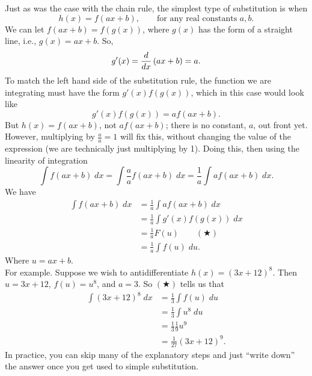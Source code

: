 \noindent Just as was the case with the chain rule, the simplest type of substitution is when
\[
h(x) = f(ax+b), \qquad \text{for any real constants $a,b.$}
\] 
We can let $f(ax+b) = f(g(x))$, where $g(x)$ has the form of a straight line, i.e., $g(x) = ax+b$. So,
\[
g'(x) = \frac{d}{dx}\left(ax+b\right) = a.
\]
To match the left hand side of the substitution rule, the function we are integrating must have the form $g'(x)f(g(x))$, which in this case would look like
\[
g'(x)f(g(x)) = af(ax+b). \tag{since $g'(x) = a$}
\]
But $h(x) = f(ax+b)$, not $af(ax+b)$; there is no constant, $a$, out front yet. However, multiplying by $\frac{a}{a} = 1$ will fix this, without changing the value of the expression (we are technically just multiplying by 1). Doing this, then using the linearity of integration
\[
\int f(ax+b) \; dx = \int\frac{a}{a} f(ax+b) \; dx = \frac{1}{a} \int af(ax+b) \; dx.
\]
We have
\begin{align*}
\int f(ax+b) \; dx & = \frac{1}{a} \int af(ax+b) \; dx \\
	& = \frac{1}{a} \int g'(x)f(g(x)) \; dx \tag{since $g(x) = ax+b$ and $g'(x) = a$} \\
	& = \frac{1}{a} F(u) \qquad (\bigstar) \tag{letting $u = g(x)$, integration by substitution} \\
	& = \frac{1}{a} \int f(u) \; du. \tag{since $F$ is an antiderivative of $f$}
\end{align*}
Where $u = ax+b$. \\

\noindent For example. Suppose we wish to antidifferentiate $h(x) = (3x+12)^8$. Then $u = 3x+12$, $f(u) = u^8$, and $a = 3$. So $(\bigstar)$ tells us that
\begin{align*}
\int (3x+12)^8 \; dx & = \frac{1}{3} \int f(u) \; du \\
	& = \frac{1}{3} \int u^8 \; du \tag{since $f(u) = u^8$} \\
	& = \frac{1}{3} \frac{1}{9}u^9 \tag{integration formula} \\
	& = \frac{1}{27} (3x+12)^9. \tag{since $u = 3x+12$}
\end{align*}
In practice, you can skip many of the explanatory steps and just ``write down'' the answer once you get used to simple substitution.

